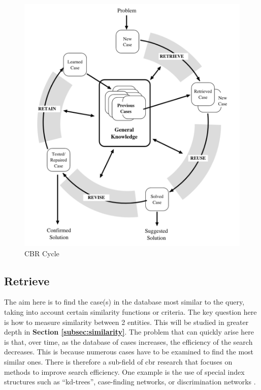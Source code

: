     \begin{figure}[h]
    \centering
    \includegraphics[scale=0.6]{images/Concept-cbr-cycle.png}
    \caption[CBR Cycle]{\label{fig:cbr-cycle}  CBR Cycle \cite{cbrIntroRecent}}
    \end{figure}
    

    \subsection{Retrieve}
    The aim here is to find the case(s) in the database most similar to the query, taking into account certain similarity functions or criteria. The key question here is how to measure similarity between 2 entities. This will be studied in greater depth in \textbf{Section \ref{subsec:similarity}}. The problem that can quickly arise here is that, over time, as the database of cases increases, the efficiency of the search decreases. This is because numerous cases have to be examined to find the most similar ones. There is therefore a sub-field of \acrshort{cbr} research that focuses on methods to improve search efficiency. One example is the use of special index structures such as “kd-trees”, case-finding networks, or discrimination networks \cite{cbrIntroRecent}.
    

